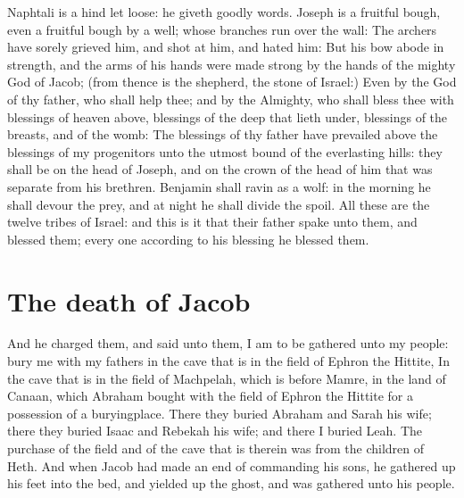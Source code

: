 \begin{biblechapter}
\verse Naphtali is a hind let loose: he giveth goodly words.
\verse Joseph is a fruitful bough, even a fruitful bough by a well; whose branches run over the wall:
\verse The archers have sorely grieved him, and shot at him, and hated him:
\verse But his bow abode in strength, and the arms of his hands were made strong by the hands of the mighty God of Jacob; (from thence is the shepherd, the stone of Israel:)
\verse Even by the God of thy father, who shall help thee; and by the Almighty, who shall bless thee with blessings of heaven above, blessings of the deep that lieth under, blessings of the breasts, and of the womb:
\verse The blessings of thy father have prevailed above the blessings of my progenitors unto the utmost bound of the everlasting hills: they shall be on the head of Joseph, and on the crown of the head of him that was separate from his brethren.
\verse Benjamin shall ravin as a wolf: in the morning he shall devour the prey, and at night he shall divide the spoil.
\verse All these are the twelve tribes of Israel: and this is it that their father spake unto them, and blessed them; every one according to his blessing he blessed them.
\section*{The death of Jacob}
\verse And he charged them, and said unto them, I am to be gathered unto my people: bury me with my fathers in the cave that is in the field of Ephron the Hittite,
\verse In the cave that is in the field of Machpelah, which is before Mamre, in the land of Canaan, which Abraham bought with the field of Ephron the Hittite for a possession of a buryingplace.
\verse There they buried Abraham and Sarah his wife; there they buried Isaac and Rebekah his wife; and there I buried Leah.
\verse The purchase of the field and of the cave that is therein was from the children of Heth.
\verse And when Jacob had made an end of commanding his sons, he gathered up his feet into the bed, and yielded up the ghost, and was gathered unto his people.
\end{biblechapter}


